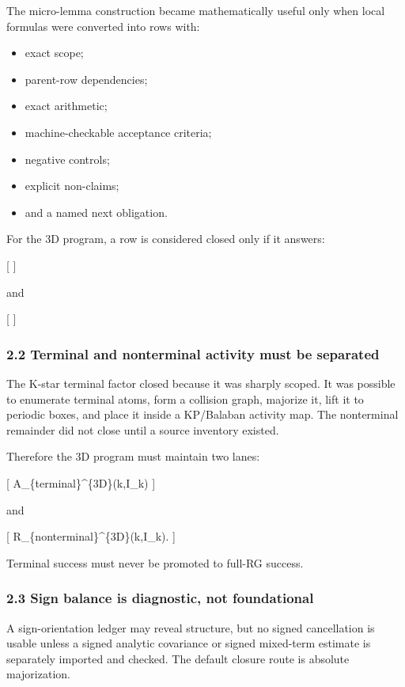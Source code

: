 \documentclass[
]{article}
\providecommand{\tightlist}{%
  \setlength{\itemsep}{0pt}\setlength{\parskip}{0pt}}
\begin{document}
The micro-lemma construction became mathematically useful only when
local formulas were converted into rows with:

\begin{itemize}
\tightlist
\item
  exact scope;
\item
  parent-row dependencies;
\item
  exact arithmetic;
\item
  machine-checkable acceptance criteria;
\item
  negative controls;
\item
  explicit non-claims;
\item
  and a named next obligation.
\end{itemize}

For the 3D program, a row is considered closed only if it answers:

{[}  {]}

and

{[}  {]}

\subsubsection{2.2 Terminal and nonterminal activity must be
separated}\label{terminal-and-nonterminal-activity-must-be-separated}

The K-star terminal factor closed because it was sharply scoped. It was
possible to enumerate terminal atoms, form a collision graph, majorize
it, lift it to periodic boxes, and place it inside a KP/Balaban activity
map. The nonterminal remainder did not close until a source inventory
existed.

Therefore the 3D program must maintain two lanes:

{[} \mathcal A\_\{\rm terminal\}\^{}\{3D\}(k,I\_k) {]}

and

{[} \mathcal R\_\{\rm nonterminal\}\^{}\{3D\}(k,I\_k). {]}

Terminal success must never be promoted to full-RG success.

\subsubsection{2.3 Sign balance is diagnostic, not
foundational}\label{sign-balance-is-diagnostic-not-foundational}

A sign-orientation ledger may reveal structure, but no signed
cancellation is usable unless a signed analytic covariance or signed
mixed-term estimate is separately imported and checked. The default
closure route is absolute majorization.
\end{document}
